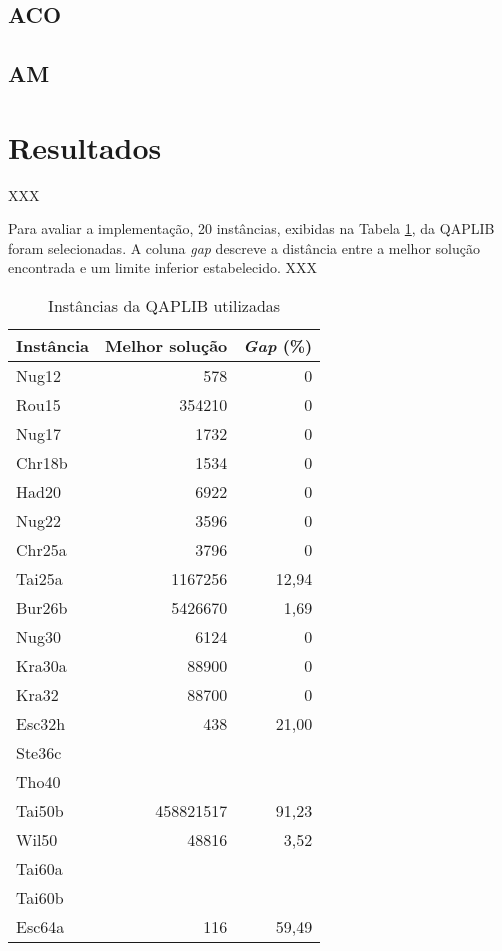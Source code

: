 \subsection{ACO}

\subsection{AM}



\section{Resultados}

XXX

Para avaliar a implementação, 20 instâncias, exibidas na Tabela
\ref{qapinst}, da QAPLIB \cite{qaplib} foram selecionadas. A coluna
\textit{gap} descreve a distância entre a melhor solução encontrada e
um limite inferior estabelecido. XXX


\begin{table}[H]
  \caption{Instâncias da QAPLIB utilizadas\label{qapinst}}
  \centering
  \begin{tabular}{l r r}
    \toprule
    Instância & Melhor solução & \textit{Gap} (\%) \\
    \midrule
    Nug12 & 578 & 0 \\
    Rou15 & 354210 & 0 \\
    Nug17 & 1732 & 0 \\
    Chr18b & 1534 & 0 \\
    Had20 & 6922 & 0 \\
    Nug22 & 3596 & 0 \\
    Chr25a & 3796 & 0 \\
    Tai25a & 1167256 & 12,94 \\
    Bur26b & 5426670 & 1,69 \\
    Nug30 & 6124 & 0 \\
    Kra30a & 88900 & 0 \\
    Kra32  & 88700 & 0 \\
    Esc32h & 438 & 21,00 \\
    Ste36c & & \\
    Tho40 & & \\
    Tai50b & 458821517 & 91,23 \\
    Wil50 & 48816 & 3,52 \\
    Tai60a & & \\
    Tai60b & & \\
    Esc64a & 116 & 59,49 \\
    \bottomrule
  \end{tabular}
\end{table}
